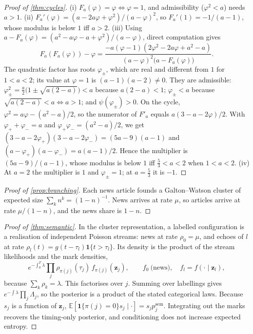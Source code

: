 \documentclass{article}
\theoremstyle{plain}
\theoremstyle{definition}
\theoremstyle{remark}
\newcommand{\E}{\mathbb{E}}
\newcommand{\z}{\bm{z}}
\newcommand{\ind}{\mathbf{1}}
\begin{document}
\begin{proof}[Proof of \cref{thm:cycles}]
(i) $F_a(\varphi)=\varphi\iff\varphi=1$, and admissibility ($\varphi^2<a$) needs $a>1$.
(ii) $F_a'(\varphi)=(a-2a\varphi+\varphi^2)/(a-\varphi)^2$, so $F_a'(1)=-1/(a-1)$, whose modulus is below $1$ iff $a>2$.
(iii) Using $a-F_a(\varphi)=(a^2-a\varphi-a+\varphi^2)/(a-\varphi)$, direct computation gives
\[
  F_a(F_a(\varphi))-\varphi=\frac{-a(\varphi-1)(2\varphi^2-2a\varphi+a^2-a)}{(a-\varphi)^2\big(a-F_a(\varphi)\big)} .
\]
The quadratic factor has roots $\varphi_\pm$, which are real and different from $1$ for $1<a<2$; its value at $\varphi=1$ is $(a-1)(a-2)\neq0$. They are admissible: $\varphi_\pm^2=\tfrac a2\big(1\pm\sqrt{a(2-a)}\big)<a$ because $a(2-a)<1$; $\varphi_\pm<a$ because $\sqrt{a(2-a)}<a\iff a>1$; and $\psi(\varphi_\pm)>0$. On the cycle, $\varphi^2=a\varphi-(a^2-a)/2$, so the numerator of $F'_a$ equals $a(3-a-2\varphi)/2$. With $\varphi_++\varphi_-=a$ and $\varphi_+\varphi_-=(a^2-a)/2$, we get $(3-a-2\varphi_+)(3-a-2\varphi_-)=(5a-9)(a-1)$ and $(a-\varphi_+)(a-\varphi_-)=a(a-1)/2$. Hence the multiplier is $(5a-9)/(a-1)$, whose modulus is below $1$ iff $\tfrac53<a<2$ when $1<a<2$.
(iv) At $a=2$ the multiplier is $1$ and $\varphi_\pm=1$; at $a=\tfrac53$ it is $-1$.
\end{proof}

\begin{proof}[Proof of \cref{prop:branching}]
Each news article founds a Galton--Watson cluster of expected size $\sum_kn^k=(1-n)^{-1}$. News arrives at rate $\mu$, so articles arrive at rate $\mu/(1-n)$, and the news share is $1-n$.
\end{proof}

\begin{proof}[Proof of \cref{thm:semantic}]
In the cluster representation, a labelled configuration is a realisation of independent Poisson streams: news at rate $\rho_0=\mu$, and echoes of $l$ at rate $\rho_l(t)=g(t-\tau_l)\ind\{t>\tau_l\}$. Its density is the product of the stream likelihoods and the mark densities,
\[
  e^{-\int_0^T\lambda}\prod_{j}\rho_{\pi(j)}(\tau_j)\,f_{\pi(j)}(\z_j),\qquad f_0\ \text{(news)},\quad f_l=f(\cdot\mid\z_l),
\]
because $\sum_k\rho_k=\lambda$. This factorises over $j$. Summing over labellings gives $e^{-\int\lambda}\prod_j\Lambda_j$, so the posterior is a product of the stated categorical laws. Because $s_j$ is a function of $\z_j$, $\E[\ind\{\pi(j)=0\}s_j\mid\cdot]=s_jp^{\mathrm{sem}}_j$. Integrating out the marks recovers the timing-only posterior, and conditioning does not increase expected entropy.
\end{proof}
\end{document}
